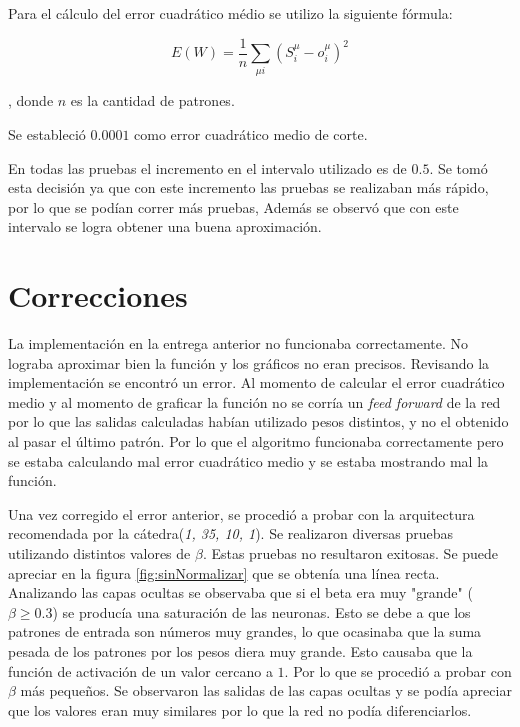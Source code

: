 \documentclass[11pt,a4paper]{article}
\begin{document}
Para el cálculo del error cuadrático médio se utilizo la siguiente fórmula:

$$E(W) = \frac{1}{n} \sum_{\mu i}{(S_i^{\mu} - o_i^{\mu})^2}$$

, donde $n$ es la cantidad de patrones.

Se estableció $0.0001$ como error cuadrático medio de corte.

En todas las pruebas el incremento en el intervalo utilizado es de $0.5$. Se tomó esta decisión ya que con este incremento las pruebas se realizaban más rápido, por lo que se podían correr más pruebas, Además se observó que con este intervalo se logra obtener una buena aproximación.

\section{Correcciones}

La implementación en la entrega anterior no funcionaba correctamente. No lograba aproximar bien la función y los gráficos no eran precisos. Revisando la implementación se encontró un error. Al momento de calcular el error cuadrático medio y al momento de graficar la función no se corría un \emph{feed forward} de la red por lo que las salidas calculadas habían utilizado pesos distintos, y no el obtenido al pasar el último patrón. Por lo que el algoritmo funcionaba correctamente pero se estaba calculando mal error cuadrático medio y se estaba mostrando mal la función.

Una vez corregido el error anterior, se procedió a probar con la arquitectura recomendada por la cátedra(\emph{1, 35, 10, 1}). Se realizaron diversas pruebas utilizando distintos valores de $\beta$. Estas pruebas no resultaron exitosas. Se puede apreciar en la figura \ref{fig:sinNormalizar} que se obtenía una línea recta. Analizando las capas ocultas se observaba que si el beta era muy "grande" ($\beta \geq 0.3$) se producía una saturación de las neuronas. Esto se debe a que los patrones de entrada son números muy grandes, lo que ocasinaba que la suma pesada de los patrones por los pesos diera muy grande. Esto causaba que la función de activación de un valor cercano a $1$. Por lo que se procedió a probar con $\beta$ más pequeños. Se observaron las salidas de las capas ocultas y se podía apreciar que los valores eran muy similares por lo que la red no podía diferenciarlos.
\end{document}
